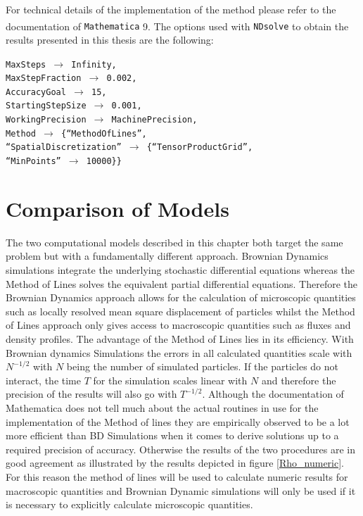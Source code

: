 For technical details of the implementation of the method please refer to the documentation of {\tt Mathematica} 9\textsuperscript{\textregistered}. The options used with {\tt NDsolve} to obtain the results presented in this thesis are the following:\par
{\tt    MaxSteps $\rightarrow$ Infinity,  \\
        MaxStepFraction $\rightarrow$ 0.002, \\
        AccuracyGoal $\rightarrow$ 15,  \\
        StartingStepSize $\rightarrow$ 0.001, \\
        WorkingPrecision $\rightarrow$ MachinePrecision, \\
        Method $\rightarrow$ \{``MethodOfLines'', \\
            ``SpatialDiscretization'' $\rightarrow$ \{``TensorProductGrid'', \\
            ``MinPoints'' $\rightarrow$ 10000\}\}}

\section{Comparison of Models}
The two computational models described in this chapter both target the same problem but with a fundamentally different approach. Brownian Dynamics simulations integrate the underlying stochastic differential equations whereas the Method of Lines solves the equivalent partial differential equations. Therefore the Brownian Dynamics approach allows for the calculation of microscopic quantities such as locally resolved mean square displacement of particles whilst the Method of Lines approach only gives access to macroscopic quantities such as fluxes and density profiles. The advantage of the Method of Lines lies in its efficiency. With Brownian dynamics Simulations the errors in all calculated quantities scale with $N^{-1/2}$ with $N$ being the number of simulated particles. If the particles do not interact, the time $T$ for the simulation scales linear with $N$ and therefore the precision of the results will also go with $T^{-1/2}$. Although the documentation of Mathematica does not tell much about the actual routines in use for the implementation of the Method of lines they are empirically observed to be a lot more efficient than BD Simulations when it comes to derive solutions up to a required precision of accuracy. Otherwise the results of the two procedures are in good agreement as illustrated by the results depicted in figure \ref{Rho_numeric}.\\
For this reason the method of lines will be used to calculate numeric results for macroscopic quantities and Brownian Dynamic simulations will only be used if it is necessary to explicitly calculate microscopic quantities.


